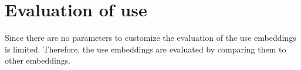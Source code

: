 \section{Evaluation of \ac{use}}\label{sec:evaluation-use}

Since there are no parameters to customize the evaluation of the \ac{use} embeddings is limited.
Therefore, the \ac{use} embeddings are evaluated by comparing them to other embeddings.